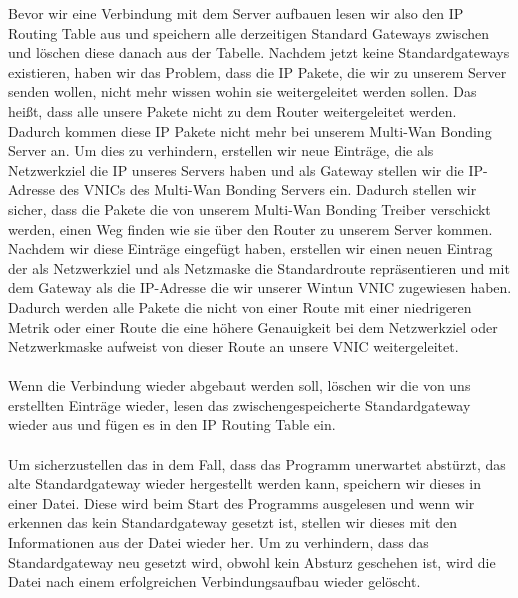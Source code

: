 Bevor wir eine Verbindung mit dem Server aufbauen lesen wir also den IP Routing Table aus und speichern alle derzeitigen Standard Gateways zwischen und löschen diese danach aus der Tabelle. Nachdem jetzt keine Standardgateways existieren, haben wir das Problem, dass die IP Pakete, die wir zu unserem Server senden wollen, nicht mehr wissen wohin sie weitergeleitet werden sollen. Das heißt, dass alle unsere Pakete nicht zu dem Router weitergeleitet werden. Dadurch kommen diese IP Pakete nicht mehr bei unserem Multi-Wan Bonding Server an. Um dies zu verhindern, erstellen wir neue Einträge, die als Netzwerkziel die IP unseres Servers haben und als Gateway stellen wir die IP-Adresse des VNICs des Multi-Wan Bonding Servers ein. Dadurch stellen wir sicher, dass die Pakete die von unserem Multi-Wan Bonding Treiber verschickt werden, einen Weg finden wie sie über den Router zu unserem Server kommen. Nachdem wir diese Einträge eingefügt haben, erstellen wir einen neuen Eintrag der als Netzwerkziel und als Netzmaske die Standardroute repräsentieren und mit dem Gateway als die IP-Adresse die wir unserer Wintun VNIC zugewiesen haben. Dadurch werden alle Pakete die nicht von einer Route mit einer niedrigeren Metrik oder einer Route die eine höhere Genauigkeit bei dem Netzwerkziel oder Netzwerkmaske aufweist von dieser Route an unsere VNIC weitergeleitet.
\\\\
Wenn die Verbindung wieder abgebaut werden soll, löschen wir die von uns erstellten Einträge wieder, lesen das zwischengespeicherte Standardgateway wieder aus und fügen es in den IP Routing Table ein.
\\\\
Um sicherzustellen das in dem Fall, dass das Programm unerwartet abstürzt, das alte Standardgateway wieder hergestellt werden kann, speichern wir dieses in einer Datei. Diese wird beim Start des Programms ausgelesen und wenn wir erkennen das kein Standardgateway gesetzt ist, stellen wir dieses mit den Informationen aus der Datei wieder her. Um zu verhindern, dass das Standardgateway neu gesetzt wird, obwohl kein Absturz geschehen ist, wird die Datei nach einem erfolgreichen Verbindungsaufbau wieder gelöscht.

